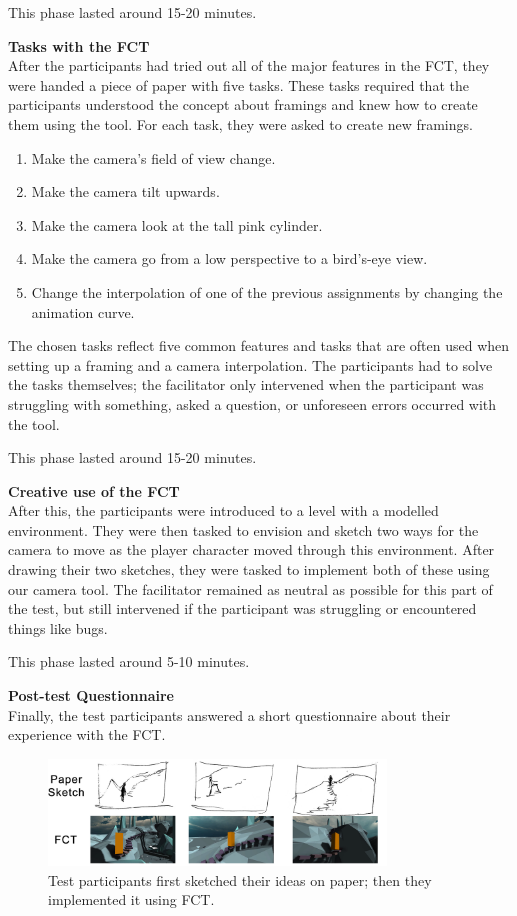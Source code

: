 This phase lasted around 15-20 minutes.

\textbf{Tasks with the FCT}\\
After the participants had tried out all of the major features in the FCT, they were handed a piece of paper with five tasks. These tasks required that the participants understood the concept about framings and knew how to create them using the tool. For each task, they were asked to create new framings.

\begin{enumerate}
\item Make the camera's field of view change.
\item Make the camera tilt upwards.
\item Make the camera look at the tall pink cylinder.
\item Make the camera go from a low perspective to a bird's-eye view.
\item Change the interpolation of one of the previous assignments by changing the animation curve.
\end{enumerate} 

The chosen tasks reflect five common features and tasks that are often used when setting up a framing and a camera interpolation. The participants had to solve the tasks themselves; the facilitator only intervened when the participant was struggling with something, asked a question, or unforeseen errors occurred with the tool.

This phase lasted around 15-20 minutes.

\textbf{Creative use of the FCT}\\
After this, the participants were introduced to a level with a modelled environment. They were then tasked to envision and sketch two ways for the camera to move as the player character moved through this environment. After drawing their two sketches, they were tasked to implement both of these using our camera tool. The facilitator remained as neutral as possible for this part of the test, but still intervened if the participant was struggling or encountered things like bugs.


This phase lasted around 5-10 minutes.

\textbf{Post-test Questionnaire}\\
Finally, the test participants answered a short questionnaire about their experience with the FCT.

\begin{figure}[htbp]
\centering
\includegraphics[width=0.8\textwidth]{Pics/Sketching_Framings}
\caption{Test participants first sketched their ideas on paper; then they implemented it using FCT.}
\label{fig:Sketching_Framings}
\end{figure}